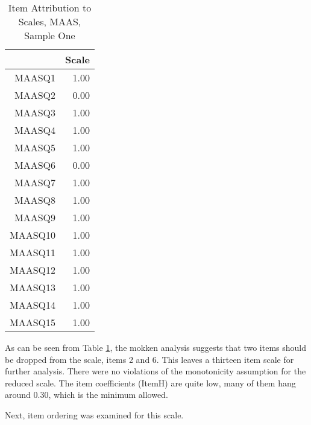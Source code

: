 \documentclass{article}
\begin{document}
\begin{table}[ht]
\centering
\begin{tabular}{rr}
  \hline
 & Scale \\ 
  \hline
MAASQ1 & 1.00 \\ 
  MAASQ2 & 0.00 \\ 
  MAASQ3 & 1.00 \\ 
  MAASQ4 & 1.00 \\ 
  MAASQ5 & 1.00 \\ 
  MAASQ6 & 0.00 \\ 
  MAASQ7 & 1.00 \\ 
  MAASQ8 & 1.00 \\ 
  MAASQ9 & 1.00 \\ 
  MAASQ10 & 1.00 \\ 
  MAASQ11 & 1.00 \\ 
  MAASQ12 & 1.00 \\ 
  MAASQ13 & 1.00 \\ 
  MAASQ14 & 1.00 \\ 
  MAASQ15 & 1.00 \\ 
   \hline
\end{tabular}
\caption{Item Attribution to Scales, MAAS, Sample One} 
\label{tab:maasassumptioncheck}
\end{table}
As can be seen from Table \ref{tab:maasassumptioncheck}, the mokken analysis suggests that two items should be dropped from the scale, items 2 and 6. This leaves a thirteen item scale for further analysis. There were no violations of the monotonicity assumption for the reduced scale. The item coefficients (ItemH) are quite low, many of them hang around 0.30, which is the minimum allowed. 


Next, item ordering was examined for this scale.
\end{document}
